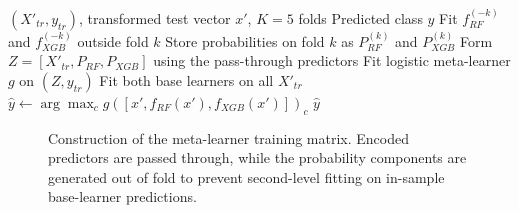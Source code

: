 ﻿\documentclass[preprint,12pt]{elsarticle}
\begin{document}
\begin{algorithm}[H]
\caption{Leakage-controlled out-of-fold stacking and held-out inference}
\label{alg:stack}
\small
\begin{algorithmic}[1]
\Require $(X'_{tr},y_{tr})$, transformed test vector $x'$, $K=5$ folds
\Ensure Predicted class $\hat y$
\State Fit $f_{RF}^{(-k)}$ and $f_{XGB}^{(-k)}$ outside fold $k$
\State Store probabilities on fold $k$ as $P_{RF}^{(k)}$ and $P_{XGB}^{(k)}$
\EndFor
\State Form $Z=[X'_{tr},P_{RF},P_{XGB}]$ using the pass-through predictors
\State Fit logistic meta-learner $g$ on $(Z,y_{tr})$
\State Fit both base learners on all $X'_{tr}$
\State $\hat y\gets\arg\max_c g([x',f_{RF}(x'),f_{XGB}(x')])_c$
\State \Return $\hat y$
\end{algorithmic}
\end{algorithm}

\begin{figure}[H]
\centering
{}
\caption{Construction of the meta-learner training matrix. Encoded predictors are passed through, while the probability components are generated out of fold to prevent second-level fitting on in-sample base-learner predictions.}
\label{fig:oof}
\end{figure}

\FloatBarrier
\end{document}
